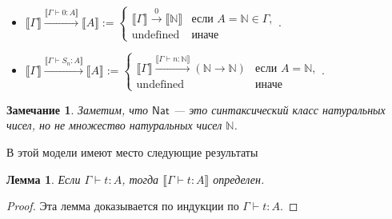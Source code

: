 \documentclass[openany]{book}
\theoremstyle{plain}
\newtheorem{lem}[thm]{Лемма}
\newtheorem{note}{Замечание}[section]
\theoremstyle{definition}
\newcommand{\N}{\mathbb{N}}
\newcommand{\nat}{\mathsf{Nat}}
\begin{document}
\begin{itemize}
    \item \(\llbracket \Gamma \rrbracket \overset{\llbracket \Gamma \vdash 0 : A \rrbracket}{\longrightarrow} \llbracket A \rrbracket := \begin{cases}\llbracket \Gamma \rrbracket \overset{0}{\longrightarrow} \llbracket \N \rrbracket & \text{если }A=\N \in \Gamma,\\ \text{undefined} & \text{иначе}\end{cases}.\)

    \item \(\llbracket \Gamma \rrbracket \overset{\llbracket \Gamma \vdash S_n : A \rrbracket}{\longrightarrow} \llbracket A \rrbracket := \begin{cases}\llbracket \Gamma \rrbracket \overset{\llbracket \Gamma \vdash n : \N \rrbracket}{\longrightarrow} (\N \to \N) & \text{если }A = \N,\\ \text{undefined} & \text{иначе}\end{cases}.\)
\end{itemize}

\begin{note}
    Заметим, что \(\nat\) --- это синтаксический класс натуральных чисел, но не множество натуральных чисел \(\N\). 
\end{note}

В этой модели имеют место следующие результаты
\begin{lem}
    Если \(\Gamma \vdash t : A\), тогда \(\llbracket \Gamma \vdash t : A \rrbracket\) определен.
\end{lem}
\begin{proof}
    Эта лемма доказывается по индукции по \(\Gamma \vdash t : A\).
\end{proof}
\end{document}
